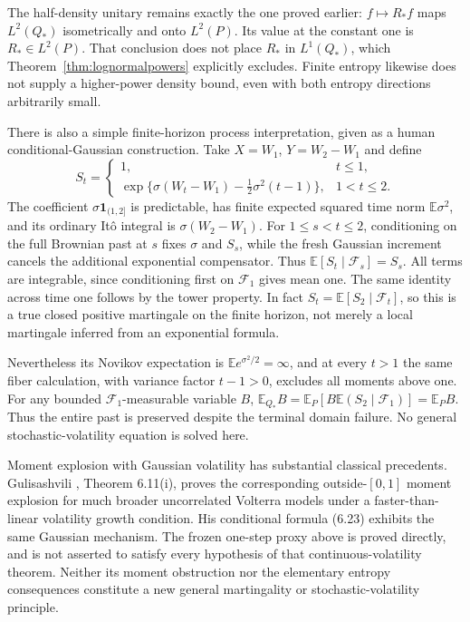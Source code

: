 \documentclass[11pt]{article}
\theoremstyle{remark}\newtheorem{remark}[theorem]{Remark}
\newcommand{\E}{\mathbb E}
\begin{document}
The half-density unitary remains exactly the one proved earlier:
$f\mapsto R_*f$ maps $L^2(Q_*)$ isometrically and onto $L^2(P)$.
Its value at the constant one is $R_*\in L^2(P)$. That conclusion
does not place $R_*$ in $L^1(Q_*)$, which Theorem~\ref{thm:lognormalpowers}
explicitly excludes. Finite entropy likewise does not supply a
higher-power density bound, even with both entropy directions
arbitrarily small.

There is also a simple finite-horizon process interpretation, given
as a human conditional-Gaussian construction. Take $X=W_1$,
$Y=W_2-W_1$ and define
\[
 S_t=\begin{cases}
 1,&t\le1,\\
 \exp\{\sigma(W_t-W_1)-\tfrac12\sigma^2(t-1)\},&1<t\le2.
 \end{cases}
\]
The coefficient $\sigma\mathbf1_{(1,2]}$ is predictable, has finite
expected squared time norm $\E\sigma^2$, and its ordinary It\^o
integral is $\sigma(W_2-W_1)$. For $1\le s<t\le2$, conditioning on
the full Brownian past at $s$ fixes $\sigma$ and $S_s$, while the
fresh Gaussian increment cancels the additional exponential
compensator. Thus $\E[S_t\mid\mathcal F_s]=S_s$. All terms are
integrable, since conditioning first on $\mathcal F_1$ gives mean
one. The same identity across time one follows by the tower
property. In fact $S_t=\E[S_2\mid\mathcal F_t]$, so this is a true
closed positive martingale on the finite horizon, not merely a
local martingale inferred from an exponential formula.

Nevertheless its Novikov expectation is
$\E e^{\sigma^2/2}=\infty$, and at every $t>1$ the same fiber
calculation, with variance factor $t-1>0$, excludes all moments
above one. For any bounded $\mathcal F_1$-measurable variable $B$,
$\E_{Q_*}B=\E_P[B\E(S_2\mid\mathcal F_1)]=\E_P B$.
Thus the entire past is preserved despite the terminal domain
failure. No general stochastic-volatility equation is solved here.

Moment explosion with Gaussian volatility has substantial classical
precedents. Gulisashvili \cite{gulisashvili}, Theorem 6.11(i), proves
the corresponding outside-$[0,1]$ moment explosion for much broader
uncorrelated Volterra models under a faster-than-linear volatility
growth condition. His conditional formula (6.23) exhibits the same
Gaussian mechanism. The frozen one-step proxy above is proved
directly, and is not asserted to satisfy every hypothesis of that
continuous-volatility theorem. Neither its moment obstruction nor
the elementary entropy consequences constitute a new general
martingality or stochastic-volatility principle.
\end{document}
